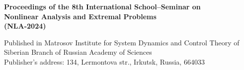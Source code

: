 \documentclass[12pt,final]{llncs}
\begin{document}
\begin{englisharticle}

\end{englisharticle}

\begin{englisharticle}

\end{englisharticle}

\begin{englisharticle}

\end{englisharticle}



\begin{englisharticle}

\end{englisharticle}

\begin{englisharticle}

\end{englisharticle}

\begin{englisharticle}

\end{englisharticle}

\begin{englisharticle}

\end{englisharticle}

\begin{englisharticle}

\end{englisharticle}

\begin{englisharticle}

\end{englisharticle}


\newpage

\newpage
\thispagestyle{empty}
 \begin{englisharticle}
\begin{center}
${}$
\vfill




{\bf  Proceedings of the 8th International School--Seminar on\\[0.3em]
 Nonlinear Analysis and Extremal Problems\\[0.3em]  (NLA-2024)}

\vfill\vfill



Published in Matrosov Institute for System Dynamics and Control Theory
of\\ Siberian Branch of Russian Academy of Sciences\\[0.5em]

Publisher's address: 134, Lermontova str., Irkutsk, Russia, 664033

\end{center}

 \end{englisharticle}
\end{document}
